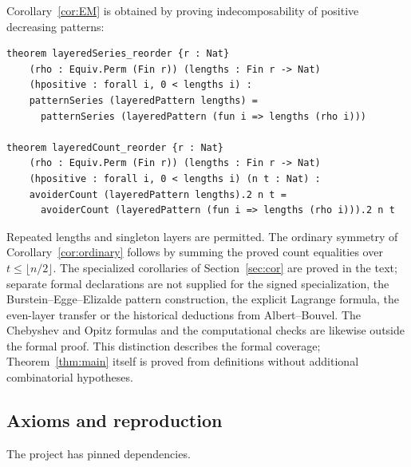 \documentclass[11pt]{amsart}
\theoremstyle{definition}
\begin{document}
Corollary~\ref{cor:EM} is obtained by proving indecomposability of positive decreasing patterns:
\begin{small}
\begin{verbatim}
theorem layeredSeries_reorder {r : Nat}
    (rho : Equiv.Perm (Fin r)) (lengths : Fin r -> Nat)
    (hpositive : forall i, 0 < lengths i) :
    patternSeries (layeredPattern lengths) =
      patternSeries (layeredPattern (fun i => lengths (rho i)))

theorem layeredCount_reorder {r : Nat}
    (rho : Equiv.Perm (Fin r)) (lengths : Fin r -> Nat)
    (hpositive : forall i, 0 < lengths i) (n t : Nat) :
    avoiderCount (layeredPattern lengths).2 n t =
      avoiderCount (layeredPattern (fun i => lengths (rho i))).2 n t
\end{verbatim}
\end{small}
Repeated lengths and singleton layers are permitted. The ordinary symmetry of Corollary~\ref{cor:ordinary} follows by summing the proved count equalities over $t\le\lfloor n/2\rfloor$. The specialized corollaries of Section~\ref{sec:cor} are proved in the text; separate formal declarations are not supplied for the signed specialization, the Burstein--Egge--Elizalde pattern construction, the explicit Lagrange formula, the even-layer transfer or the historical deductions from Albert--Bouvel. The Chebyshev and Opitz formulas and the computational checks are likewise outside the formal proof. This distinction describes the formal coverage; Theorem~\ref{thm:main} itself is proved from definitions without additional combinatorial hypotheses.

\subsection{Axioms and reproduction}
The project has pinned dependencies.
\end{document}
